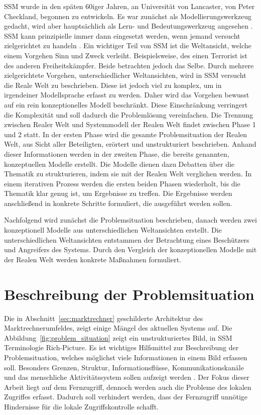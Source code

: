 \documentclass[11pt,a4paper]{report}
\begin{document}
SSM wurde in den späten 60iger Jahren, an Universität von Lancaster, von Peter Checkland, begonnen zu entwickeln. Es war zunächst als Modellierungswerkzeug gedacht, wird aber hauptsächlich als Lern- und Bedeutungswerkzeug angesehen \cite{bobwill}. SSM kann prinzipielle immer dann eingesetzt werden, wenn jemand versucht zielgerichtet zu handeln \cite{checkland1}. Ein wichtiger Teil von SSM ist die Weltansicht, welche einem Vorgehen Sinn und Zweck verleiht. Beispielsweise, des einen Terrorist ist des anderen Freiheitskämpfer. Beide betrachten jedoch das Selbe. Durch mehrere zielgerichtete Vorgehen, unterschiedlicher Weltansichten, wird in SSM versucht die Reale Welt zu beschrieben. Diese ist jedoch viel zu komplex, um in irgendeiner Modellsprache erfasst zu werden. Daher wird das Vorgehen bewusst auf ein rein konzeptionelles Modell beschränkt. Diese Einschränkung verringert die Komplexität und soll dadurch die Problemlösung vereinfachen. Die Trennung zwischen Realer Welt und Systemmodell der Realen Welt findet zwischen Phase 1 und 2 statt. In der ersten Phase wird die gesamte Problemsituation der Realen Welt, aus Sicht aller Beteiligten, erörtert und unstrukturiert beschrieben. Anhand dieser Informationen werden in der zweiten Phase, die bereits genannten, konzeptuellen Modelle erstellt. Die Modelle dienen dazu Debatten über die Thematik zu strukturieren, indem sie mit der Realen Welt verglichen werden. In einem iterativen Prozess werden die ersten beiden Phasen wiederholt, bis die Thematik klar genug ist, um Ergebnisse zu treffen. Die Ergebnisse werden anschließend in konkrete Schritte formuliert, die ausgeführt werden sollen.

Nachfolgend wird zunächst die Problemsituation beschrieben, danach werden zwei konzeptionell Modelle aus unterschiedlichen Weltansichten erstellt. Die unterschiedlichen Weltansichten entstammen der Betrachtung eines Beschützers und Angreifers des Systems. Durch den Vergleich der konzeptionellen Modelle mit der Realen Welt werden konkrete Maßnahmen formuliert.


\section{Beschreibung der Problemsituation} \label{sec:problem_situation}

Die in Abschnitt~\ref{sec:marktrechner} geschilderte Architektur des Marktrechnerumfeldes, zeigt einige Mängel des aktuellen Systems auf. Die Abbildung~\ref{fig:problem_situation} zeigt ein unstrukturiertes Bild, in SSM Terminologie Rich-Picture. Es ist wichtiges Hilfsmittel zur Beschreibung der Problemsituation, welches möglichst viele Informationen in einem Bild erfassen soll. Besonders Grenzen, Struktur, Informationsflüsse, Kommunikationskanäle und das menschliche Aktivitätssystem sollen aufzeigt werden \cite{ssmger}. Der Fokus dieser Arbeit liegt auf dem Fernzugriff, dennoch werden auch die Probleme des lokalen Zugriffes erfasst. Dadurch soll verhindert werden, dass der Fernzugriff unnötige Hindernisse für die lokale Zugriffskontrolle schafft. 
\end{document}
